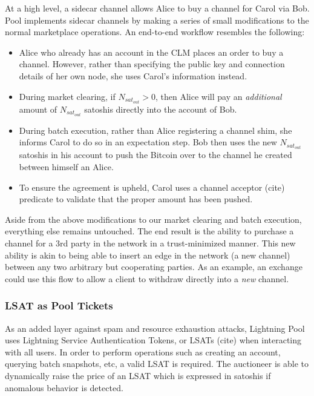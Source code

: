 \documentclass[10pt,a4paper]{article}
\theoremstyle{definition}
\begin{document}
At a high level, a sidecar channel allows Alice to buy a channel for Carol via
Bob. Pool implements sidecar channels by making a series of small modifications to
the normal marketplace operations. An end-to-end workflow resembles the
following:
\begin{itemize}
    \item Alice who already has an account in the CLM places an order to buy a
        channel. However, rather than specifying the public key and connection
        details of her own node, she uses Carol's information instead.

    \item During market clearing, if $N_{sat_{out}} > 0$, then Alice will pay
        an \emph{additional} amount of $N_{sat_{out}}$ satoshis directly into
        the account of Bob.

    \item During batch execution, rather than Alice registering a channel shim,
        she informs Carol to do so in an expectation step. Bob then uses the
        new $N_{sat_{out}}$ satoshis in his account to push the Bitcoin over to
        the channel he created between himself an Alice.

    \item To ensure the agreement is upheld, Carol uses a channel acceptor
        (cite) predicate to validate that the proper amount has been pushed.
\end{itemize}

Aside from the above modifications to our market clearing and batch execution,
everything else remains untouched. The end result is the ability to purchase a
channel for a 3rd party in the network in a trust-minimized manner. This new
ability is akin to being able to insert an edge in the network (a new channel)
between any two arbitrary but cooperating parties. As an example, an exchange
could use this flow to allow a client to withdraw directly into a \emph{new}
channel. 

\subsubsection{LSAT as Pool Tickets}

As an added layer against spam and resource exhaustion attacks, Lightning Pool
uses Lightning Service Authentication Tokens, or LSATs (cite) when interacting
with all users. In order to perform operations such as creating an account,
querying batch snapshots, etc, a valid LSAT is required. The auctioneer is able
to dynamically raise the price of an LSAT which is expressed in satoshis if
anomalous behavior is detected.
\end{document}
